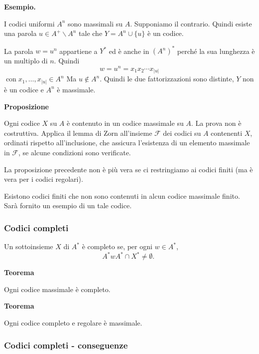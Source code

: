 \vspace{5mm}

\textbf{Esempio.}

I codici uniformi $A^{n}$ sono massimali su $A$.
Supponiamo il contrario. Quindi esiste una parola $u \in A^{+} \backslash A^{n}$ tale che $Y=A^{n} \cup\{u\}$ è un codice.

La parola $w=u^{n}$ appartiene a $Y^{*}$ ed è anche in $\left(A^{n}\right)^{*}$ perché la sua lunghezza è un multiplo di $n$.
Quindi
$$
w=u^{n}=x_{1} x_{2} \cdots x_{|u|}
$$
$\operatorname{con} x_{1}, \ldots, x_{|u|} \in A^{n}$
Ma $u \notin A^{n}$. Quindi le due fattorizzazioni sono distinte, $Y$ non è un codice e $A^{n}$ è massimale.

\vspace{5mm}

\textbf{Proposizione}

Ogni codice $X$ su $A$ è contenuto in un codice massimale su $A$.
La prova non è costruttiva. Applica il lemma di Zorn all'insieme $\mathcal{F}$ dei codici su $A$ contenenti $X$, ordinati rispetto all'inclusione, che assicura l'esistenza di un elemento massimale in $\mathcal{F}$, se alcune condizioni sono verificate.

\vspace{5mm}

La proposizione precedente non è più vera se ci restringiamo ai codici finiti (ma è vera per i codici regolari).

Esistono codici finiti che non sono contenuti in alcun codice massimale finito.
Sarà fornito un esempio di un tale codice.

\subsubsection{Codici completi}

Un sottoinsieme $X$ di $A^{*}$ è completo se, per ogni $w \in A^{*}$,
$$
A^{*} w A^{*} \cap X^{*} \neq \emptyset \text {. }
$$

\vspace{5mm}

\textbf{Teorema}

Ogni codice massimale è completo.

\vspace{5mm}

\textbf{Teorema}

Ogni codice completo e regolare è massimale.

\subsubsection{Codici completi - conseguenze}

